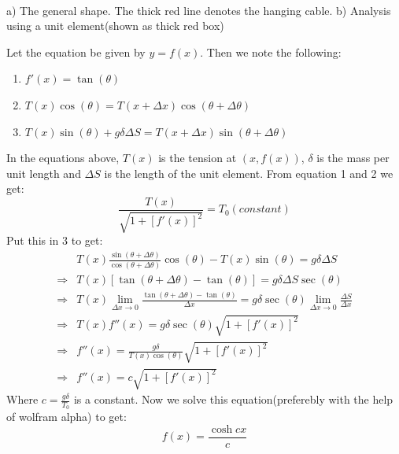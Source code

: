 \documentclass[oneside]{book}\twocolumn
\begin{document}
\begin{center}
\\
    a) The general shape. The thick red line denotes the hanging cable. b) Analysis using a unit element(shown as thick red box)
\end{center}
Let the equation be given by $y=f(x)$. Then we note the following:
\begin{enumerate}
    \item $f'(x)=\tan(\theta)$
    \item $T(x)\cos(\theta)=T(x+\Delta x)\cos(\theta+\Delta\theta)$
    \item $T(x)\sin(\theta)+g\delta\Delta S=T(x+\Delta x)\sin(\theta+\Delta\theta)$
\end{enumerate}
In the equations above, $T(x)$ is the tension at $(x,f(x))$, $\delta$ is the mass per unit length and $\Delta S$ is the length of the unit element. From equation 1 and 2 we get:
$$\frac{T(x)}{\sqrt{1+[f'(x)]^2}}=T_0(constant)$$
Put this in 3 to get:
\begin{align*}
    &T(x)\frac{\sin(\theta+\Delta \theta)}{\cos(\theta+\Delta \theta)}\cos(\theta)-T(x)\sin(\theta)=g\delta\Delta S\\
    \Rightarrow&T(x)[\tan(\theta+\Delta\theta)-\tan(\theta)]=g\delta\Delta S\sec(\theta)\\
    \Rightarrow&T(x)\lim_{\Delta x\to0}\frac{\tan(\theta+\Delta \theta)-\tan(\theta)}{\Delta x}=g\delta\sec(\theta)\lim_{\Delta x\to 0}\frac{\Delta S}{\Delta x}\\
    \Rightarrow& T(x)f''(x)=g\delta\sec(\theta)\sqrt{1+[f'(x)]^2}\\
    \Rightarrow&f''(x)=\frac{g\delta}{T(x)\cos(\theta)}\sqrt{1+[f'(x)]^2}\\
    \Rightarrow&f''(x)=c\sqrt{1+[f'(x)]^2}
\end{align*}
Where $c=\frac{g\delta}{T_0}$ is a constant. Now we solve this equation(preferebly with the help of wolfram alpha) to get:
$$f(x)=\frac{\cosh cx}{c}$$
\end{document}
